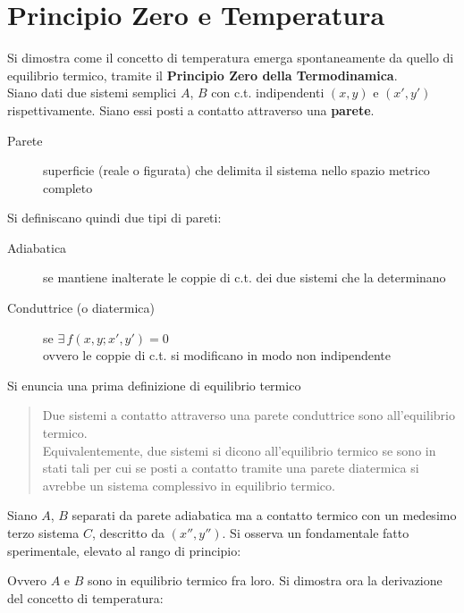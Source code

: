 \documentclass[10pt, oneside]{book}
\begin{document}
\chapter{Principio Zero e Temperatura}
Si dimostra come il concetto di temperatura emerga spontaneamente da quello di equilibrio termico, tramite il \textbf{Principio Zero della Termodinamica}.
\\Siano dati due sistemi semplici $A$, $B$ con c.t. indipendenti $(x,y)$ e $(x',y')$ rispettivamente. Siano essi posti a contatto attraverso una \textbf{parete}.
\begin{description}
\item[Parete] superficie (reale o figurata) che delimita il sistema nello spazio metrico completo
\end{description}
Si definiscano quindi due tipi di pareti:
\begin{description}
\item[Adiabatica] se mantiene inalterate le coppie di c.t. dei due sistemi che la determinano
\item[Conduttrice (o diatermica)] se $\displaystyle \exists \, f(x,y; x', y') = 0$	 \\ovvero le coppie di c.t. si modificano in modo non indipendente
\end{description}
Si enuncia una prima definizione di equilibrio termico
\begin{quote}
Due sistemi a contatto attraverso una parete conduttrice sono all'equilibrio termico.
\\Equivalentemente, due sistemi si dicono all'equilibrio termico se sono in stati tali per cui se posti a contatto tramite una parete diatermica si avrebbe un sistema complessivo in equilibrio termico.
\end{quote}
Siano $A$, $B$ separati da parete adiabatica ma a contatto termico con un medesimo terzo sistema $C$, descritto da $(x'', y'')$. Si osserva un fondamentale fatto sperimentale, elevato al rango di principio:
\begin{center}


\end{center}
Ovvero $A$ e $B$ sono in equilibrio termico fra loro. Si dimostra ora la derivazione del concetto di temperatura:
\end{document}
